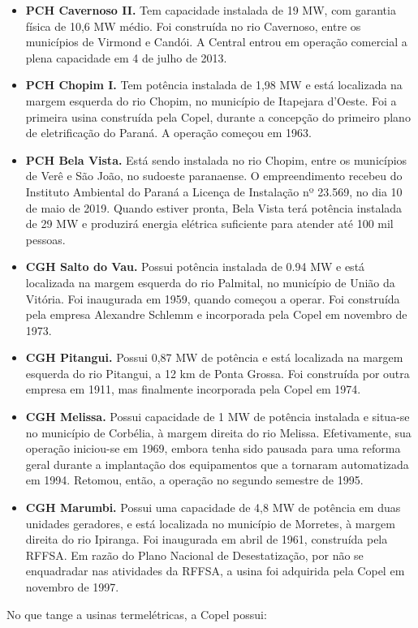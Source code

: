 \documentclass[aprovado,numbers]{coppe}
\begin{document}
\begin{itemize}
  \item
    \textbf{PCH Cavernoso II.} Tem capacidade instalada de 19 MW, com garantia física de 10,6 MW médio. Foi construída no rio Cavernoso, entre os municípios de Virmond e Candói. A Central entrou em operação comercial a plena capacidade em 4 de julho de 2013.
  \item
    \textbf{PCH Chopim I.} Tem potência instalada de 1,98 MW e está localizada na margem esquerda do rio Chopim, no município de Itapejara d'Oeste. Foi a primeira usina construída pela Copel, durante a concepção do primeiro plano de eletrificação do Paraná. A operação começou em 1963.
  \item
    \textbf{PCH Bela Vista.} Está sendo instalada no rio Chopim, entre os municípios de Verê e São João, no sudoeste paranaense. O empreendimento recebeu do Instituto Ambiental do Paraná a Licença de Instalação nº 23.569, no dia 10 de maio de 2019. Quando estiver pronta, Bela Vista terá potência instalada de 29 MW e produzirá energia elétrica suficiente para atender até 100 mil pessoas.
  \item
    \textbf{CGH Salto do Vau.} Possui potência instalada de 0.94 MW e está localizada na margem esquerda do rio Palmital, no município de União da Vitória. Foi inaugurada em 1959, quando começou a operar. Foi construída pela empresa Alexandre Schlemm e incorporada pela Copel em novembro de 1973.
  \item
    \textbf{CGH Pitangui.} Possui 0,87 MW de potência e está localizada na margem esquerda do rio Pitangui, a 12 km de Ponta Grossa. Foi construída por outra empresa em 1911, mas finalmente incorporada pela Copel em 1974.
  \item
    \textbf{CGH Melissa.} Possui capacidade de 1 MW de potência instalada e situa-se no município de Corbélia, à margem direita do rio Melissa. Efetivamente, sua operação iniciou-se em 1969, embora tenha sido pausada para uma reforma geral durante a implantação dos equipamentos que a tornaram automatizada em 1994. Retomou, então, a operação no segundo semestre de 1995.
  \item
    \textbf{CGH Marumbi.} Possui uma capacidade de 4,8 MW de potência em duas unidades geradores, e está localizada no município de Morretes, à margem direita do rio Ipiranga. Foi inaugurada em abril de 1961, construída pela RFFSA. Em razão do Plano Nacional de Desestatização, por não se enquadradar nas atividades da RFFSA, a usina foi adquirida pela Copel em novembro de 1997.
  \end{itemize}
  No que tange a usinas termelétricas, a Copel possui:
\end{document}
